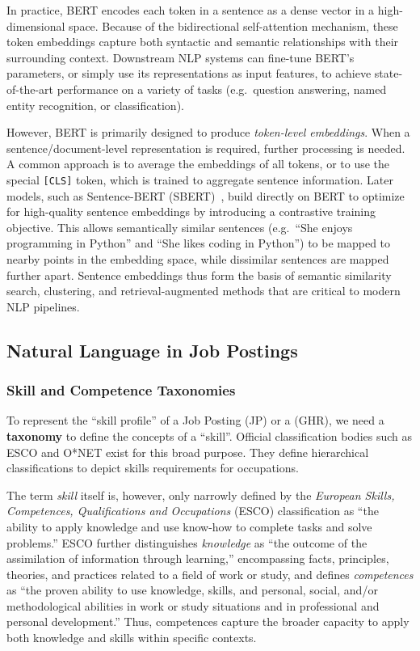 In practice, BERT encodes each token in a sentence as a dense vector in a high-dimensional space.
Because of the bidirectional self-attention mechanism, these token embeddings capture both syntactic and semantic relationships with their surrounding context.
Downstream NLP systems can fine-tune BERT’s parameters, or simply use its representations as input features, to achieve state-of-the-art performance on a variety of tasks (e.g.\ question answering, named entity recognition, or classification).

However, BERT is primarily designed to produce \emph{token-level embeddings}.
When a sentence/document-level representation is required, further processing is needed.
A common approach is to average the embeddings of all tokens, or to use the special \texttt{[CLS]} token, which is trained to aggregate sentence information.
Later models, such as Sentence-BERT (SBERT)~\cite{reimers_2019_SentenceBERTSentence}, build directly on BERT to optimize for high-quality sentence embeddings by introducing a contrastive training objective.
This allows semantically similar sentences (e.g.\ ``She enjoys programming in Python'' and ``She likes coding in Python'') to be mapped to nearby points in the embedding space, while dissimilar sentences are mapped further apart.
Sentence embeddings thus form the basis of semantic similarity search, clustering, and retrieval-augmented methods that are critical to modern NLP pipelines.

\subsection{Natural Language in Job Postings}
\subsubsection{Skill and Competence Taxonomies}

To represent the ``skill profile'' of a Job Posting (JP) or a \ghrepo{} (GHR), we need a \textbf{taxonomy} to define the concepts of a ``skill''.
Official classification bodies such as ESCO and O*NET exist for this broad purpose. They define hierarchical classifications to depict skills requirements for occupations.

The term \emph{skill} itself is, however, only narrowly defined by the \emph{European Skills, Competences, Qualifications and Occupations} (ESCO) classification \cite{ESCO-site} as “the ability to apply knowledge and use know-how to complete tasks and solve problems.”
ESCO further distinguishes \emph{knowledge} as “the outcome of the assimilation of information through learning,” encompassing facts, principles, theories, and practices related to a field of work or study,
and defines \emph{competences} as “the proven ability to use knowledge, skills, and personal, social, and/or methodological abilities in work or study situations and in professional and personal development.”
Thus, competences capture the broader capacity to apply both knowledge and skills within specific contexts.

